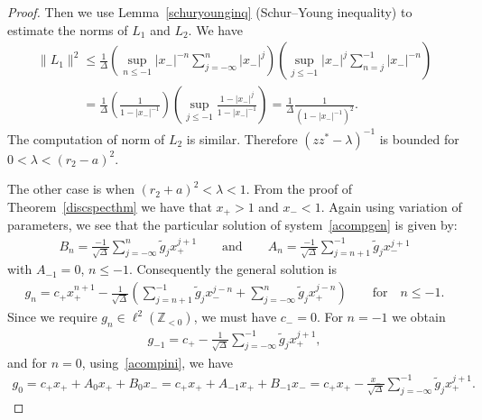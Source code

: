 \documentclass[pdftex]{sigma}
\numberwithin{equation}{section}
\begin{document}
\begin{proof}
Then we use Lemma~\ref{schuryounginq} (Schur--Young inequality) to estimate the norms of $L_1$ and $L_2$.
We have
\begin{gather*}
\|L_1\|^2
\le \frac{1}{\Delta}\left(\underset{n\le-1}{\sup}|x_-|^{-n}\sum\limits_{j=-\infty}^n|x_-|^j\right)
\left(\underset{j\le-1}{\sup}|x_-|^j\sum\limits_{n=j}^{-1}|x_-|^{-n}\right)
\\
\phantom{\|L_1\|^2}{}
 =\frac{1}{\Delta}\left(\frac{1}{1-|x_-|^{-1}}\right)\left(\underset{j\le-1}{\sup}\frac{1-|x_-|^{j}}{1-|x_-|^{-1}}\right)
 =\frac{1}{\Delta}\frac{1}{(1-|x_-|^{-1})^2}.
\end{gather*}
The computation of norm of $L_2$ is similar.
Therefore $(zz^*-\lambda)^{-1}$ is bounded for $0<\lambda<(r_2-a)^2$.

The other case is when $(r_2+a)^2<\lambda<1$.
From the proof of Theorem~\ref{discspecthm} we have that $x_+>1$ and $x_-<1$.
Again using variation of parameters, we see that the particular solution of system~\eqref{acompgen} is given by:
\begin{gather*}
B_n=\frac{-1}{\sqrt{\Delta}}\sum\limits_{j=-\infty}^n\tilde{g}_jx_+^{j+1}
\qquad
\text{and}
\qquad
A_n=\frac{-1}{\sqrt{\Delta}}\sum\limits_{j=n+1}^{-1}\tilde{g}_jx_-^{j+1}
\end{gather*}
with $A_{-1}=0$, $n\leq -1$.
Consequently the general solution is
\begin{gather*}
g_n=c_+x_+^{n+1} -\frac{1}{\sqrt{\Delta}}\left(\sum\limits_{j=n+1}^{-1}\tilde{g}_jx_-^{j-n}+\sum\limits_{j=-\infty}^n\tilde{g}_jx_+^{j-n}\right)
\qquad
\text{for}
\quad
n\leq-1.
\end{gather*}
Since we require $g_n\in\ell^2({\mathbb Z}_{<0})$, we must have $c_-=0$.
For $n=-1$ we obtain
\begin{gather*}
g_{-1}=c_+-\frac{1}{\sqrt{\Delta}}\sum\limits_{j=-\infty}^{-1}\tilde{g}_jx_+^{j+1},
\end{gather*}
and for $n=0$, using~\eqref{acompini}, we have
\begin{gather*}
g_{0}=c_+ x_++A_0x_++B_0x_-= c_+ x_++A_{-1}x_++B_{-1}x_-=c_+ x_+-\frac{x_-}{\sqrt{\Delta}}\sum\limits_{j=-\infty}^{-1}\tilde{g}_jx_+^{j+1}.
\end{gather*}


\end{proof}
\end{document}
